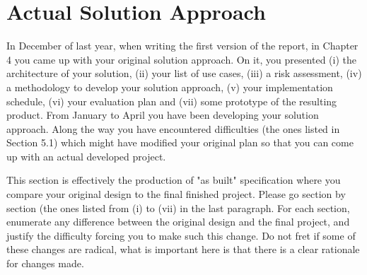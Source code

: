 \section{Actual Solution Approach}
In December of last year, when writing the first version of the report, in Chapter 4 you came up with your original solution approach. On it, you presented (i) the architecture of your solution, (ii) your list of use cases, (iii) a risk assessment, (iv) a methodology to develop your solution approach, (v) your implementation schedule, (vi) your evaluation plan and (vii) some prototype of the resulting product. From January to April you have been developing your solution approach. Along the way you have encountered difficulties (the ones listed in Section 5.1) which might have modified your original plan so that you can come up with an actual developed project.

This section is effectively the production of "as built" specification where you compare your original design to the final finished project. Please go section by section (the ones listed from (i) to (vii) in the last paragraph. For each section, enumerate any difference between the original design and the final project, and justify the difficulty forcing you to make such this change. Do not fret if some of these changes are radical, what is important here is that there is a clear rationale for changes made.